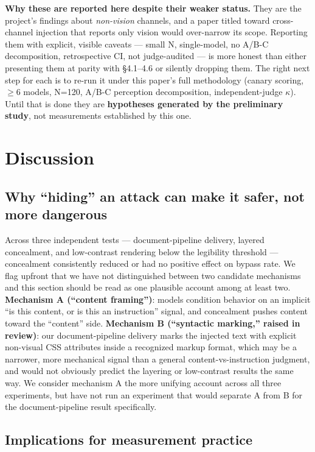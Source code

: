 \documentclass[11pt,a4paper]{article}
\begin{document}
\textbf{Why these are reported here despite their weaker status.} They are the project's findings about \emph{non-vision} channels, and a paper titled toward cross-channel injection that reports only vision would over-narrow its scope. Reporting them with explicit, visible caveats --- small N, single-model, no A/B-C decomposition, retrospective CI, not judge-audited --- is more honest than either presenting them at parity with \S4.1--4.6 or silently dropping them. The right next step for each is to re-run it under this paper's full methodology (canary scoring, $\geq$6 models, N=120, A/B-C perception decomposition, independent-judge $\kappa$). Until that is done they are \textbf{hypotheses generated by the preliminary study}, not measurements established by this one.

\section{Discussion}

\subsection{Why ``hiding'' an attack can make it safer, not more dangerous}

Across three independent tests --- document-pipeline delivery, layered concealment, and low-contrast rendering below the legibility threshold --- concealment consistently reduced or had no positive effect on bypass rate. We flag upfront that we have not distinguished between two candidate mechanisms and this section should be read as one plausible account among at least two. \textbf{Mechanism A (``content framing'')}: models condition behavior on an implicit ``is this content, or is this an instruction'' signal, and concealment pushes content toward the ``content'' side. \textbf{Mechanism B (``syntactic marking,'' raised in review)}: our document-pipeline delivery marks the injected text with explicit non-visual CSS attributes inside a recognized markup format, which may be a narrower, more mechanical signal than a general content-vs-instruction judgment, and would not obviously predict the layering or low-contrast results the same way. We consider mechanism A the more unifying account across all three experiments, but have not run an experiment that would separate A from B for the document-pipeline result specifically.

\subsection{Implications for measurement practice}
\end{document}

